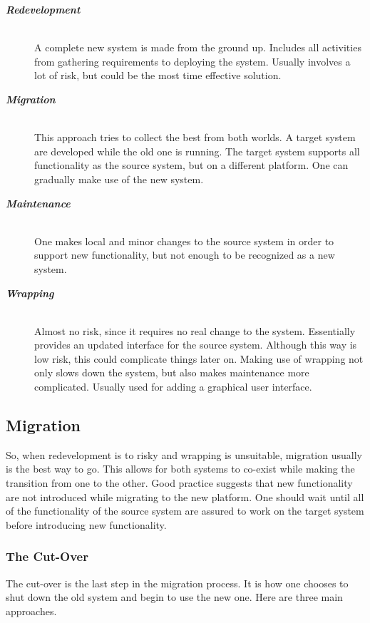 \begin{description}
\item[\textbf{\textit{Redevelopment}}]\hfill\\
A complete new system is made from the ground up.
Includes all activities from gathering requirements to deploying the system.
Usually involves a lot of risk, but could be the most time effective solution.
\item[\textbf{\textit{Migration}}]\hfill\\
This approach tries to collect the best from both worlds.
A target system are developed while the old one is running.
The target system supports all functionality as the source system, but on a different platform.
One can gradually make use of the new system.
\newpage
\item[\textbf{\textit{Maintenance}}]\hfill\\
One makes local and minor changes to the source system in order to support new functionality, but not enough to be recognized as a new system.
\item[\textbf{\textit{Wrapping}}]\hfill\\
Almost no risk, since it requires no real change to the system. Essentially provides an updated interface for the source system. Although this way is low risk, this could complicate things later on. Making use of wrapping not only slows down the system, but also makes maintenance more complicated. Usually used for adding a graphical user interface.
\end{description} 

\subsection{Migration}
So, when redevelopment is to risky and wrapping is unsuitable, migration usually is the best way to go. This allows for both systems to co-exist while making the transition from one to the other.
Good practice suggests that new functionality are not introduced while migrating to the new platform.
One should wait until all of the functionality of the source system are assured to work on the target system before introducing new functionality.

\subsubsection{The Cut-Over}
The cut-over is the last step in the migration process. 
It is how one chooses to shut down the old system and begin to use the new one.
Here are three main approaches.

